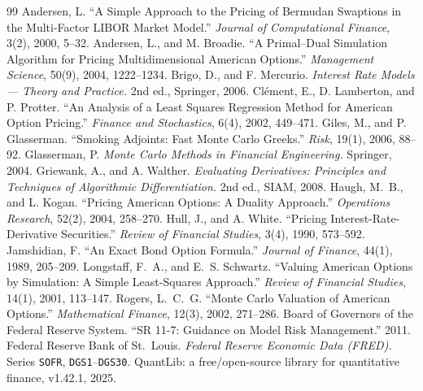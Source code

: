 \documentclass[11pt]{article}
\theoremstyle{plain}
\theoremstyle{definition}
\begin{document}
\begin{thebibliography}{99}\small
{} Andersen, L. ``A Simple Approach to the Pricing of Bermudan Swaptions in the Multi-Factor LIBOR Market Model.'' \emph{Journal of Computational Finance}, 3(2), 2000, 5--32.
 Andersen, L., and M. Broadie. ``A Primal--Dual Simulation Algorithm for Pricing Multidimensional American Options.'' \emph{Management Science}, 50(9), 2004, 1222--1234.
 Brigo, D., and F. Mercurio. \emph{Interest Rate Models --- Theory and Practice.} 2nd ed., Springer, 2006.
 Cl\'ement, E., D. Lamberton, and P. Protter. ``An Analysis of a Least Squares Regression Method for American Option Pricing.'' \emph{Finance and Stochastics}, 6(4), 2002, 449--471.
 Giles, M., and P. Glasserman. ``Smoking Adjoints: Fast Monte Carlo Greeks.'' \emph{Risk}, 19(1), 2006, 88--92.
 Glasserman, P. \emph{Monte Carlo Methods in Financial Engineering.} Springer, 2004.
 Griewank, A., and A. Walther. \emph{Evaluating Derivatives: Principles and Techniques of Algorithmic Differentiation.} 2nd ed., SIAM, 2008.
 Haugh, M.~B., and L. Kogan. ``Pricing American Options: A Duality Approach.'' \emph{Operations Research}, 52(2), 2004, 258--270.
 Hull, J., and A. White. ``Pricing Interest-Rate-Derivative Securities.'' \emph{Review of Financial Studies}, 3(4), 1990, 573--592.
 Jamshidian, F. ``An Exact Bond Option Formula.'' \emph{Journal of Finance}, 44(1), 1989, 205--209.
 Longstaff, F.~A., and E.~S. Schwartz. ``Valuing American Options by Simulation: A Simple Least-Squares Approach.'' \emph{Review of Financial Studies}, 14(1), 2001, 113--147.
 Rogers, L.~C.~G. ``Monte Carlo Valuation of American Options.'' \emph{Mathematical Finance}, 12(3), 2002, 271--286.
 Board of Governors of the Federal Reserve System. ``SR 11-7: Guidance on Model Risk Management.'' 2011.
 Federal Reserve Bank of St.\ Louis. \emph{Federal Reserve Economic Data (FRED).} Series \texttt{SOFR}, \texttt{DGS1}--\texttt{DGS30}.
 QuantLib: a free/open-source library for quantitative finance, v1.42.1, 2025.
\end{thebibliography}
\end{document}
